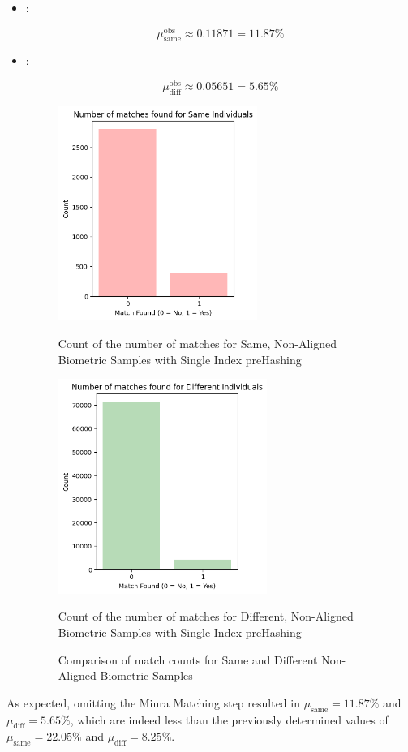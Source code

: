 \begin{itemize}
    \item {}: 
    
    \[ \mu_{\text{same}}^{\text{obs}} \approx 0.11871 = 11.87\%\]
    
    \item {}:
    
    \[ \mu_{\text{diff}}^{\text{obs}} \approx 0.05651 = 5.65\% \]

    \begin{figure}[H]
        \centering
        \begin{minipage}[b]{0.48\linewidth}
            \centering
            \includegraphics[width=\linewidth,height=7cm,keepaspectratio]{latex-img/mu_same_without_postAlignment.png}
            \caption{Count of the number of matches for Same, Non-Aligned Biometric Samples with Single Index preHashing}
            \label{mu_same_without_postAlignement}
        \end{minipage}
        \hfill
        \begin{minipage}[b]{0.48\linewidth}
            \centering
            \includegraphics[width=\linewidth,height=7cm,keepaspectratio]{latex-img/mu_diff_without_postAlignment.png}
            \caption{Count of the number of matches for Different, Non-Aligned Biometric Samples with Single Index preHashing}
            \label{mu_diff_without_postAlignement}
        \end{minipage}
        \caption{Comparison of match counts for Same and Different Non-Aligned Biometric Samples}
    \end{figure}
\end{itemize}

As expected, omitting the Miura Matching step resulted in \(\mu_{\text{same}} = 11.87\%\) and \(\mu_{\text{diff}} = 5.65\%\), which are indeed less than the previously determined values of \(\mu_{\text{same}} = 22.05\%\) and \(\mu_{\text{diff}} = 8.25\%\).

